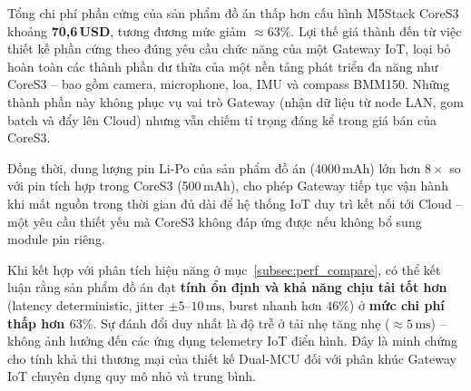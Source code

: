         Tổng chi phí phần cứng của sản phẩm đồ án thấp hơn cấu hình M5Stack CoreS3 khoảng \textbf{70{,}6\,USD}, tương đương mức giảm \textbf{$\approx 63\%$}. Lợi thế giá thành đến từ việc thiết kế phần cứng theo đúng yêu cầu chức năng của một Gateway IoT, loại bỏ hoàn toàn các thành phần dư thừa của một nền tảng phát triển đa năng như CoreS3 -- bao gồm camera, microphone, loa, IMU và compass BMM150. Những thành phần này không phục vụ vai trò Gateway (nhận dữ liệu từ node LAN, gom batch và đẩy lên Cloud) nhưng vẫn chiếm tỉ trọng đáng kể trong giá bán của CoreS3.
        
        Đồng thời, dung lượng pin Li-Po của sản phẩm đồ án (4000\,mAh) lớn hơn $8\times$ so với pin tích hợp trong CoreS3 (500\,mAh), cho phép Gateway tiếp tục vận hành khi mất nguồn trong thời gian đủ dài để hệ thống IoT duy trì kết nối tới Cloud -- một yêu cầu thiết yếu mà CoreS3 không đáp ứng được nếu không bổ sung module pin riêng.
        
        Khi kết hợp với phân tích hiệu năng ở mục~\ref{subsec:perf_compare}, có thể kết luận rằng sản phẩm đồ án đạt \textbf{tính ổn định và khả năng chịu tải tốt hơn} (latency deterministic, jitter $\pm 5$--$10\,\text{ms}$, burst nhanh hơn $46\%$) ở \textbf{mức chi phí thấp hơn $63\%$}. Sự đánh đổi duy nhất là độ trễ ở tải nhẹ tăng nhẹ ($\approx 5\,\text{ms}$) -- không ảnh hưởng đến các ứng dụng telemetry IoT điển hình. Đây là minh chứng cho tính khả thi thương mại của thiết kế Dual-MCU đối với phân khúc Gateway IoT chuyên dụng quy mô nhỏ và trung bình.
    \newpage